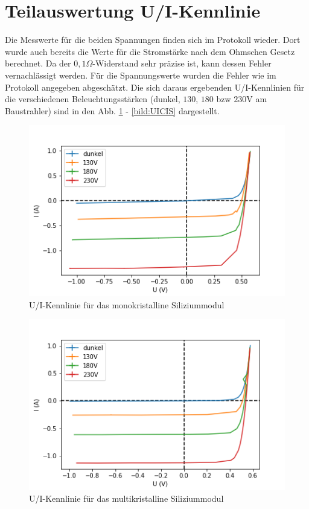 

\section{Teilauswertung U/I-Kennlinie}
Die Messwerte für die beiden Spannungen finden sich im Protokoll wieder. Dort wurde auch bereits die Werte für die Stromstärke nach dem 
Ohmschen Gesetz berechnet. Da der $0,1 \Omega$-Widerstand sehr präzise ist, kann dessen Fehler vernachlässigt werden. Für die Spannungswerte
wurden die Fehler wie im Protokoll angegeben abgeschätzt. Die sich daraus ergebenden U/I-Kennlinien für die verschiedenen Beleuchtungsstärken
(dunkel, $130$, $180$ bzw $230$V am Baustrahler) sind in den Abb. \ref{bild:UIMono} - \ref{bild:UICIS} dargestellt.

\begin{figure}[h]
    \centering
    \includegraphics[scale=0.75]{Bilder/UIMono.png}
    \caption{U/I-Kennlinie für das monokristalline Siliziummodul}
    \label{bild:UIMono}
\end{figure}

\begin{figure}[h]
    \centering
    \includegraphics[scale=0.75]{Bilder/UIMulti.png}
    \caption{U/I-Kennlinie für das multikristalline Siliziummodul}
    \label{bild:UIMulti}
\end{figure}

